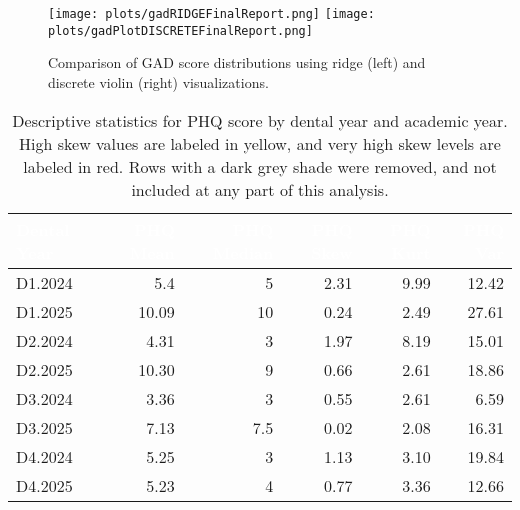 \documentclass{article}
\begin{document}
\begin{figure}[H]
    \centering
    \texttt{[image: plots/gadRIDGEFinalReport.png]}
    \hfill
    \texttt{[image: plots/gadPlotDISCRETEFinalReport.png]}
    \caption{Comparison of GAD score distributions using ridge (left) and discrete violin (right) visualizations.}
    \label{fig:gad_dist_compare}
\end{figure}


\begin{table}[H]
\tiny
\centering
\tiny
\renewcommand{\arraystretch}{0.4}

\caption{Descriptive statistics for PHQ score by dental year and academic year. High skew values are labeled in yellow, and very high skew levels are labeled in red. Rows with a dark grey shade were removed, and not included at any part of this analysis.}
\label{tab:phq_stats}

\begin{tabular}{|l|r|r|r|r|r|}
\hline
\rowcolor{black!80} 
\textcolor{white}{Dental Year} & \textcolor{white}{PHQ Mean} & \textcolor{white}{PHQ Median} & \textcolor{white}{PHQ Skew} & \textcolor{white}{PHQ Kurt} & \textcolor{white}{PHQ Var} \\
\hline
D1.2024 & 5.4 & 5 & \cellcolor{red!50}2.31 & 9.99 & 12.42 \\
D1.2025 & 10.09 & 10 & 0.24 & 2.49 & 27.61 \\
\rowcolor{gray!50} D2.2024 & 4.31 & 3 & \cellcolor{yellow!50}1.97 & 8.19 & 15.01 \\
D2.2025 & 10.30 & 9 & 0.66 & 2.61 & 18.86 \\
D3.2024 & 3.36 & 3 & 0.55 & 2.61 & 6.59 \\
D3.2025 & 7.13 & 7.5 & 0.02 & 2.08 & 16.31 \\
\rowcolor{gray!50} D4.2024 & 5.25 & 3 & \cellcolor{yellow!50}1.13 & 3.10 & 19.84 \\
D4.2025 & 5.23 & 4 & 0.77 & 3.36 & 12.66 \\
\hline
\end{tabular}
\end{table}
\end{document}
